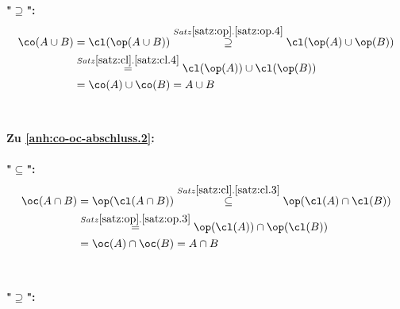     \textbf{"$\boldsymbol{\supseteq}$":}
    \begin{align*}
        \co(A \cup B) 
           &= \cl(\op(A \cup B)) 
           \overset{Satz \ref{satz:op}.\ref{satz:op.4}}{\supseteq} \cl(\op(A) \cup \op(B))\\
           &\overset{Satz \ref{satz:cl}.\ref{satz:cl.4}}{=} \cl(\op(A)) \cup \cl(\op(B))\\
           &= \co(A) \cup \co(B)
           = A \cup B
    \end{align*}
    \\ \ \\
    \noindent
    \textbf{Zu \ref{anh:co-oc-abschluss.2}:}
    \\ \ \\
    \textbf{"$\boldsymbol{\subseteq}$":}
    \begin{align*}
        \oc(A \cap B) 
           &= \op(\cl(A \cap B)) 
           \overset{Satz \ref{satz:cl}.\ref{satz:cl.3}}{\subseteq} \op(\cl(A) \cap \cl(B))\\
           &\overset{Satz \ref{satz:op}.\ref{satz:op.3}}{=} \op(\cl(A)) \cap \op(\cl(B))\\
           &= \oc(A) \cap \oc(B)
           = A \cap B
    \end{align*}
    \\ \ \\
    \textbf{"$\boldsymbol{\supseteq}$":}
